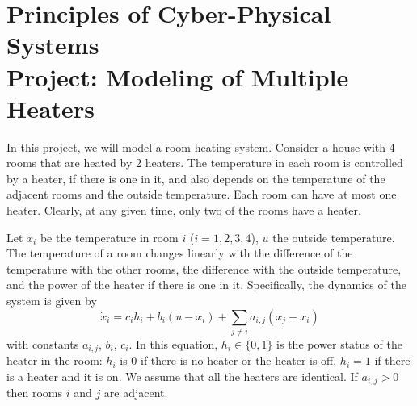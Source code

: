 \documentclass[11]{article}
\begin{document}
\def\RR{\mathbb{R}}
\def\off{\mbox{{\it off}}}
\def\dif{\mbox{{\it dif}}}

\section*{Principles of Cyber-Physical Systems\\
Project: Modeling of Multiple Heaters}


In this project, we will model a room heating system.  Consider a
house with 4 rooms that are heated by 2 heaters.  The temperature in
each room is controlled by a heater, if there is one in it, and also
depends on the temperature of the adjacent rooms and the outside
temperature.  Each room can have at most one heater.  Clearly, at any
given time, only two of the rooms have a heater.

Let $x_i$ be the temperature in room $i$ ($i=1,2,3,4$), $u$ the
outside temperature.  The temperature of a room changes
linearly with the difference of the temperature with the other rooms,
the difference with the outside temperature, and the power of the
heater if there is one in it.  Specifically, the dynamics of the
system is given by
\[ \dot{x}_i = c_i h_i + b_i(u - x_i) + \sum_{j \neq i} a_{i,j} (x_j -
x_i) \] %
with constants $a_{i,j}$, $b_i$, $c_i$.  In this equation, $h_i \in
\{0,1\}$ is the power status of the heater in the room: $h_i$ is $0$
if there is no heater or the heater is off, $h_i = 1$ if there is a
heater and it is on.  We assume that all the heaters are identical.
If $a_{i,j} > 0$ then rooms $i$ and $j$ are adjacent.
\end{document}
